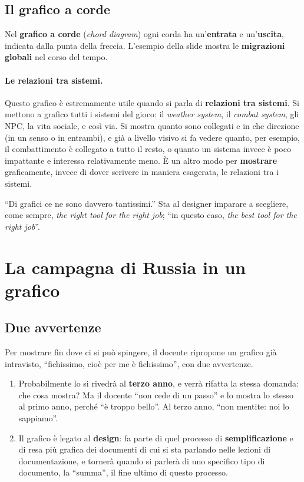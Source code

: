\subsection{Il grafico a corde}

Nel \textbf{grafico a corde} (\emph{chord diagram}) ogni corda ha
un'\textbf{entrata} e un'\textbf{uscita}, indicata dalla punta della freccia.
L'esempio della slide mostra le \textbf{migrazioni globali} nel corso del
tempo.

\paragraph{Le relazioni tra sistemi.} Questo grafico è estremamente utile
quando si parla di \textbf{relazioni tra sistemi}. Si mettono a grafico tutti
i sistemi del gioco: il \emph{weather system}, il \emph{combat system}, gli
NPC, la vita sociale, e così via. Si mostra quanto sono collegati e in che
direzione (in un senso o in entrambi), e già a livello visivo si fa vedere
quanto, per esempio, il combattimento è collegato a tutto il resto, o quanto
un sistema invece è poco impattante e interessa relativamente meno. È un
altro modo per \textbf{mostrare} graficamente, invece di dover scrivere in
maniera esagerata, le relazioni tra i sistemi.

``Di grafici ce ne sono davvero tantissimi.'' Sta al designer imparare a
scegliere, come sempre, \emph{the right tool for the right job}; ``in questo
caso, \emph{the best tool for the right job}''.

\section{La campagna di Russia in un grafico}
\label{sec:minard}



\subsection{Due avvertenze}

Per mostrare fin dove ci si può spingere, il docente ripropone un grafico già
intravisto, ``fichissimo, cioè per me è fichissimo'', con due avvertenze.
\begin{enumerate}
  \item Probabilmente lo si rivedrà al \textbf{terzo anno}, e verrà rifatta la
        stessa domanda: che cosa mostra? Ma il docente ``non cede di un
        passo'' e lo mostra lo stesso al primo anno, perché ``è troppo
        bello''. Al terzo anno, ``non mentite: noi lo sappiamo''.
  \item Il grafico è legato al \textbf{design}: fa parte di quel processo di
        \textbf{semplificazione} e di resa più grafica dei documenti di cui
        si sta parlando nelle lezioni di documentazione, e tornerà quando si
        parlerà di uno specifico tipo di documento, la ``summa'', il fine
        ultimo di questo processo.
\end{enumerate}

